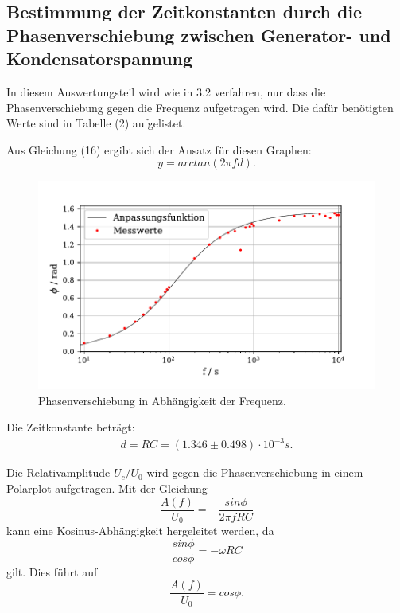 \subsection{Bestimmung der Zeitkonstanten durch die Phasenverschiebung zwischen Generator- und Kondensatorspannung}
In diesem Auswertungsteil wird wie in 3.2 verfahren, nur dass die Phasenverschiebung gegen die Frequenz aufgetragen wird.
Die dafür benötigten Werte sind in Tabelle (2) aufgelistet.

\noindent Aus Gleichung (16) ergibt sich der Ansatz für diesen Graphen:
\begin{equation}
    y = arctan(2 \pi f  d) .
\end{equation}
\begin{figure}[H]
  \centering
  \includegraphics{plot3.pdf}
  \caption{Phasenverschiebung in Abhängigkeit der Frequenz.}
  \label{fig:plot}
\end{figure}
\noindent Die Zeitkonstante beträgt:
\begin{align*}
   d = RC = (1.346 \pm 0.498) \cdot 10^{-3} s .
\end{align*}



\noindent Die Relativamplitude $U_c/U_0$ wird gegen die Phasenverschiebung in einem Polarplot aufgetragen.
Mit der Gleichung
\begin{equation*}
    \frac{A(f)}{U_0} = -\frac{sin \phi}{2\pi f RC} 
\end{equation*}
kann eine Kosinus-Abhängigkeit hergeleitet werden, da
\begin{equation*}
    \frac{sin\phi}{cos\phi} = -\omega RC 
\end{equation*}
gilt. Dies führt auf
\begin{equation}
    \frac{A(f)}{U_0} = cos\phi .
\end{equation}

